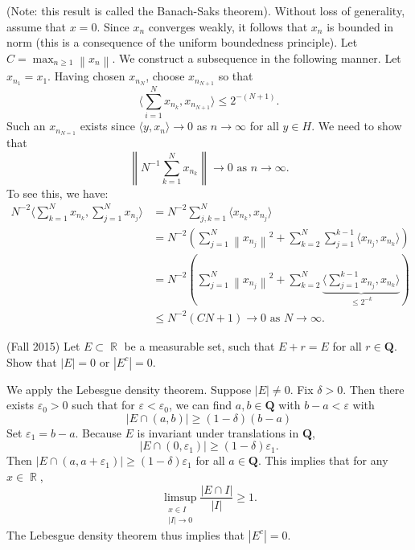 \documentclass[answers]{exam}
\DeclareMathOperator{\RR}{\mathbb{R}}
\theoremstyle{problemstyle}
\newcommand{\norm}[1]{\left\lVert#1\right\rVert} %
\newcommand{\1}[1]{\textbf{1}_{\left[#1\right]}} %
\begin{document}
\begin{questions}
\begin{solution}
  (Note: this result is called the Banach-Saks theorem). Without loss of generality, assume that $x=0$. Since $x_{n}$ converges weakly, it follows that $x_{n}$ is bounded in norm (this is a consequence of the uniform boundedness principle). Let $C = \max_{n\geq 1}\norm{x_{n}}$. We construct a subsequence in the following manner. Let $x_{n_{1}}=x_{1}$. Having chosen $x_{n_{N}}$, choose $x_{n_{N+1}}$ so that
  \begin{equation*}
    \Big\langle \sum_{i=1}^{N}x_{n_{k}},x_{n_{N+1}}\Big\rangle \leq 2^{-(N+1)}.
  \end{equation*}
  Such an $x_{n_{N=1}}$ exists since $\langle y,x_{n}\rangle \to 0$ as $n\to \infty$ for all $y\in H$. We need to show that
  \begin{equation*}
    \norm{N^{-1}\sum_{k=1}^{N}x_{n_{k}}}\to 0 \text{ as }n\to\infty.
  \end{equation*}
  To see this, we have:
  \begin{align*}
    N^{-2}\Big\langle \sum_{k=1}^{N}x_{n_{k}}, \sum_{j=1}^{N}x_{n_{j}} \Big\rangle
    &= N^{-2}\sum_{j,k=1}^{N}\Big\langle x_{n_{k}}, x_{n_{j}}\Big\rangle\\
    &= N^{-2}\left( \sum_{j=1}^{N}\norm{x_{n_{j}}}^{2}+ \sum_{k=2}^{N}\sum_{j=1}^{k-1}\langle x_{n_{j}},x_{n_{k}}\rangle \right)\\
    &=N^{-2} \left(  \sum_{j=1}^{N}\norm{x_{n_{j}}}^{2}+ \sum_{k=2}^{N}\underbrace{\Big\langle \sum_{j=1}^{k-1} x_{n_{j}},x_{n_{k}}\Big\rangle}_{\leq 2^{-k}} \right)\\
    &\leq N^{-2} \left( C N + 1  \right) \to 0 \text{ as } N\to\infty.
  \end{align*}
\end{solution}

  
  
\question (Fall 2015) Let $E \subset \RR$ be a measurable set, such that $E + r = E$ for all $r \in \mathbf{Q}$. Show that $|E| = 0$ or $|E^c| = 0$.
\begin{solution}
    We apply the Lebesgue density theorem. Suppose $|E| \neq 0$. Fix $\delta > 0$. Then there exists $\varepsilon_0 > 0$ such that for $\varepsilon < \varepsilon_0$, we can find $a,b \in \mathbf{Q}$ with $b - a < \varepsilon$ with
    \[ |E \cap (a,b)| \geq (1 - \delta) (b - a) \]
    Set $\varepsilon_1 = b - a$. Because $E$ is invariant under translations in $\mathbf{Q}$,
    \[ |E \cap (0,\varepsilon_1)| \geq (1 - \delta) \varepsilon_1. \]
    Then $|E \cap (a,a + \varepsilon_1)| \geq (1 - \delta) \varepsilon_1$ for all $a \in \mathbf{Q}$. This implies that for any $x \in \RR$,
    \[ \limsup_{\substack{x \in I\\|I| \to 0}} \frac{|E \cap I|}{|I|} \geq 1. \]
    The Lebesgue density theorem thus implies that $|E^c| = 0$.
\end{solution}


\end{questions}
\end{document}
